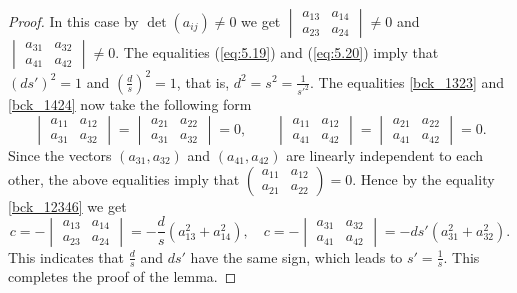 \documentclass[10pt,a4paper]{amsart}
\begin{document}
\begin{proof}
In this case by $\det(a_{ij})\neq 0$ we get $\begin{vmatrix}a_{13} & a_{14} \\ a_{23} & a_{24} \end{vmatrix} \neq 0$ and $
\begin{vmatrix}a_{31} & a_{32} \\ a_{41} & a_{42} \end{vmatrix} \neq 0$.
The equalities (\ref{eq:5.19}) and (\ref{eq:5.20}) imply that  $(ds')^2=1$ and $(\frac{d}{s})^2=1$, that is, $d^2=s^2=\frac{1}{s'^2}$.
The equalities \eqref{bck_1323} and \eqref{bck_1424} now take the following form
\[\begin{vmatrix}a_{11} & a_{12} \\ a_{31} & a_{32} \end{vmatrix}=\begin{vmatrix}a_{21} & a_{22} \\ a_{31} & a_{32} \end{vmatrix}=0,\quad \quad
\begin{vmatrix}a_{11} & a_{12} \\ a_{41} & a_{42} \end{vmatrix}=\begin{vmatrix}a_{21} & a_{22} \\ a_{41} & a_{42} \end{vmatrix}=0.\]
Since the vectors $(a_{31}, a_{32})$ and $(a_{41},a_{42})$ are linearly independent to each other, the above equalities imply that
$\begin{pmatrix}a_{11} & a_{12} \\ a_{21} & a_{22} \end{pmatrix} =0$. Hence by the equality \eqref{bck_12346} we get
\[c=-\begin{vmatrix}a_{13} & a_{14} \\ a_{23} & a_{24} \end{vmatrix} = - \frac{d}{s}(a_{13}^2+a_{14}^2),
\quad c=-\begin{vmatrix}a_{31} & a_{32} \\ a_{41} & a_{42} \end{vmatrix} = -ds'(a_{31}^2+a_{32}^2).\]
This indicates that $\frac{d}{s}$ and $ds'$ have the same sign, which leads to $s'=\frac{1}{s}$. This completes the proof of the lemma.
\end{proof}
\end{document}
